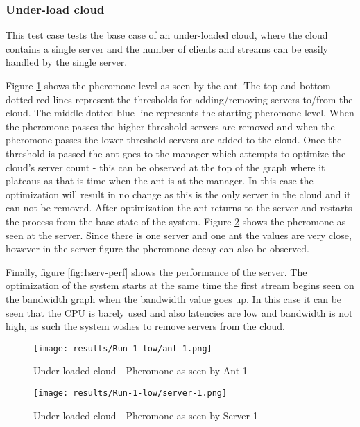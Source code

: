 \subsubsection{Under-load cloud}

This test case tests the base case of an under-loaded cloud, where the cloud contains a single server and the number of clients and streams can be easily handled by the single server.

Figure \ref{fig:1serv-ant} shows the pheromone level as seen by the ant. The top and bottom dotted red lines represent the thresholds for adding/removing servers to/from the cloud. The middle dotted blue line represents the starting pheromone level. When the pheromone passes the higher threshold servers are removed and when the pheromone passes the lower threshold servers are added to the cloud. Once the threshold is passed the ant goes to the manager which attempts to optimize the cloud's server count - this can be observed at the top of the graph where it plateaus as that is time when the ant is at the manager. In this case the optimization will result in no change as this is the only server in the cloud and it can not be removed. After optimization the ant returns to the server and restarts the process from the base state of the system. Figure \ref{fig:1serv-pher} shows the pheromone as seen at the server. Since there is one server and one ant the values are very close, however in the server figure the pheromone decay can also be observed. 

Finally, figure \ref{fig:1serv-perf} shows the performance of the server. The optimization of the system starts at the same time the first stream begins seen on the bandwidth graph when the bandwidth value goes up. In this case it can be seen that the CPU is barely used and also latencies are low and bandwidth is not high, as such the system wishes to remove servers from the cloud.

\begin{figure}
	\centering
		\texttt{[image: results/Run-1-low/ant-1.png]}
	\caption{Under-loaded cloud - Pheromone as seen by Ant 1}
	\label{fig:1serv-ant}
\end{figure}

\begin{figure}
	\centering
		\texttt{[image: results/Run-1-low/server-1.png]}
	\caption{Under-loaded cloud - Pheromone as seen by Server 1}
	\label{fig:1serv-pher}
\end{figure}

